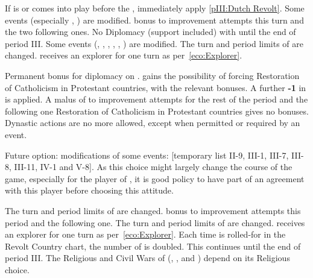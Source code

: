 \begin{digressions}


   If \paysVhollande is or comes into play
  before the , immediately apply \ref{pIII:Dutch Revolt}.
  \aparag[\CATHCR]
  \bparag Some events (especially , ) are modified.
  \aparag[\CATHCO]
  \bparag {} bonus to \STAB improvement attempts this turn and the two
  following ones.
  \aparag[Protestantism]
  \bparag No Diplomacy (support included) with \payspapaute until the end of
  period III.
  \bparag Some events (, , , ,
   ,
  ) are modified.
  \bparag The turn and period limits of \FRA are changed. \FRA receives an
  explorer for one turn as per~\ref{eco:Explorer}.



  \aparag[\CATHCR]
  \bparag Permanent bonus  for diplomacy on \payspapaute.
  \bparag \SPA gains the possibility of forcing Restoration of Catholicism in
  Protestant countries, with the relevant bonuses.
  \aparag[\CATHCO]
  \bparag A further {\bf -1} in \STAB is applied.
  \bparag A malus of  to \STAB improvement attempts for the rest of
  the period and the following one
  \bparag Restoration of Catholicism in Protestant countries gives no bonuses.
  \bparag Dynastic actions are no more allowed, except when permitted or
  required by an event.
  \begin{designnote} Future option: modifications of some events: [temporary
    list II-9, III-1, III-7, III-8, III-11, IV-1 and V-8]. As this choice
    might largely change the course of the game, especially for the player of
    \VEN, it is good policy to have part of an agreement with this player
    before choosing this attitude.
  \end{designnote}



  \aparag[\CATHCR]
  \bparag The turn and period limits of \ENG are changed.
  \aparag[\CATHCO]
  \bparag {} bonus to \STAB improvement attempts this period and the
  following one.
  \aparag[Protestantism]
  \bparag The turn and period limits of \ENG are changed. \ENG receives an
  explorer for one turn as per~\ref{eco:Explorer}.
  \bparag Each time \ENG is rolled-for in the Revolt Country chart, the number
  of \REVOLT is doubled. This continues until the end of period III.
  \aparag The Religious and Civil Wars of \ENG (,
  ,  and
  ) depend on its Religious choice.



\end{digressions}
